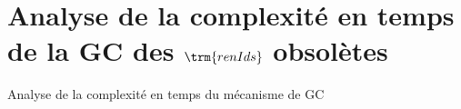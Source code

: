 \section{Analyse de la complexité en temps de la GC des $\trm{renIds}$ obsolètes}

\begin{frame}{Analyse de la complexité en temps du mécanisme de GC}
    \begin{table}[!ht]
        \centering
        \caption{Complexité en temps du mécanisme de la suppression des $\trm{renIds}$ obsolètes}
        \caption*{$p$: nombre de noeuds (ou pairs) du système, $e$: nombre d'époques dans l'\emph{arbre des époques}, $h$: hauteur de l'\emph{arbre des époques}}
      \end{table}
\end{frame}
